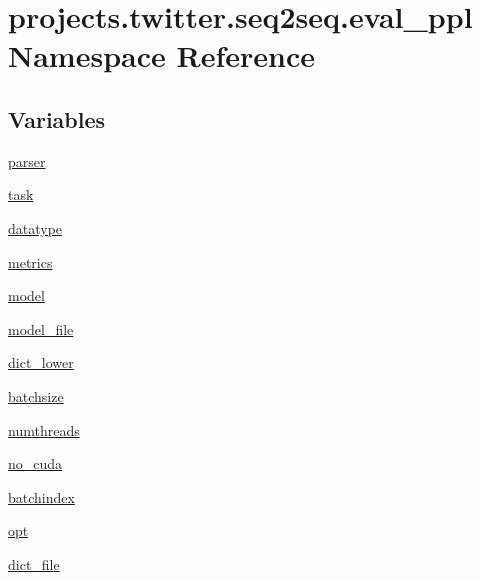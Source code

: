 \hypertarget{namespaceprojects_1_1twitter_1_1seq2seq_1_1eval__ppl}{}\section{projects.\+twitter.\+seq2seq.\+eval\+\_\+ppl Namespace Reference}
\label{namespaceprojects_1_1twitter_1_1seq2seq_1_1eval__ppl}
\subsection*{Variables}
\begin{DoxyCompactItemize}
\item 
\hyperlink{namespaceprojects_1_1twitter_1_1seq2seq_1_1eval__ppl_a58de09ffe0e977c1b7e34dde79ea71ce}{parser}
\item 
\hyperlink{namespaceprojects_1_1twitter_1_1seq2seq_1_1eval__ppl_a68ab0d0170b8f5d5eaee4f933b8b7640}{task}
\item 
\hyperlink{namespaceprojects_1_1twitter_1_1seq2seq_1_1eval__ppl_a6963271d88f5f2e169382883e1803158}{datatype}
\item 
\hyperlink{namespaceprojects_1_1twitter_1_1seq2seq_1_1eval__ppl_ae591212e77874eeef460de9d3e73c40b}{metrics}
\item 
\hyperlink{namespaceprojects_1_1twitter_1_1seq2seq_1_1eval__ppl_a957ad68eeb80ae62a16b997dbd7c4228}{model}
\item 
\hyperlink{namespaceprojects_1_1twitter_1_1seq2seq_1_1eval__ppl_a3581d64c392393e1c845011552cc5044}{model\+\_\+file}
\item 
\hyperlink{namespaceprojects_1_1twitter_1_1seq2seq_1_1eval__ppl_a7cffe03cb1131a93d7e8f99efbbb0180}{dict\+\_\+lower}
\item 
\hyperlink{namespaceprojects_1_1twitter_1_1seq2seq_1_1eval__ppl_ae5ba2a95bcfac4763cc3fae49c954f78}{batchsize}
\item 
\hyperlink{namespaceprojects_1_1twitter_1_1seq2seq_1_1eval__ppl_a0b0aa04b4b36bc75ad6ee018d2da4533}{numthreads}
\item 
\hyperlink{namespaceprojects_1_1twitter_1_1seq2seq_1_1eval__ppl_a80313b03835229ac187a2ba372d794bb}{no\+\_\+cuda}
\item 
\hyperlink{namespaceprojects_1_1twitter_1_1seq2seq_1_1eval__ppl_aec0204ef721b0bd41fb245129495429f}{batchindex}
\item 
\hyperlink{namespaceprojects_1_1twitter_1_1seq2seq_1_1eval__ppl_a94d21f9fb493bc113066eb0fb91ef244}{opt}
\item 
\hyperlink{namespaceprojects_1_1twitter_1_1seq2seq_1_1eval__ppl_aeb65d54dbb519e3f783fca6b64f5a28c}{dict\+\_\+file}
\end{DoxyCompactItemize}


